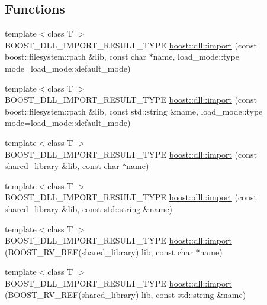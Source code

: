 \subsection*{Functions}
\begin{DoxyCompactItemize}
\item 
{\footnotesize template$<$class T $>$ }\\B\+O\+O\+S\+T\+\_\+\+D\+L\+L\+\_\+\+I\+M\+P\+O\+R\+T\+\_\+\+R\+E\+S\+U\+L\+T\+\_\+\+T\+Y\+PE \hyperlink{a00254_ade82cd3690b6f9f21ce1f92563c04694}{boost\+::dll\+::import} (const boost\+::filesystem\+::path \&lib, const char $\ast$name, load\+\_\+mode\+::type mode=load\+\_\+mode\+::default\+\_\+mode)
\item 
{\footnotesize template$<$class T $>$ }\\B\+O\+O\+S\+T\+\_\+\+D\+L\+L\+\_\+\+I\+M\+P\+O\+R\+T\+\_\+\+R\+E\+S\+U\+L\+T\+\_\+\+T\+Y\+PE \hyperlink{a00254_aabe8a061e53eb6ec4ea80ff5eb7a9c29}{boost\+::dll\+::import} (const boost\+::filesystem\+::path \&lib, const std\+::string \&name, load\+\_\+mode\+::type mode=load\+\_\+mode\+::default\+\_\+mode)
\item 
{\footnotesize template$<$class T $>$ }\\B\+O\+O\+S\+T\+\_\+\+D\+L\+L\+\_\+\+I\+M\+P\+O\+R\+T\+\_\+\+R\+E\+S\+U\+L\+T\+\_\+\+T\+Y\+PE \hyperlink{a00254_a1feb1943049297f6177c9e80d1f96202}{boost\+::dll\+::import} (const shared\+\_\+library \&lib, const char $\ast$name)
\item 
{\footnotesize template$<$class T $>$ }\\B\+O\+O\+S\+T\+\_\+\+D\+L\+L\+\_\+\+I\+M\+P\+O\+R\+T\+\_\+\+R\+E\+S\+U\+L\+T\+\_\+\+T\+Y\+PE \hyperlink{a00254_a7697764076cbe4d8e7705b2a4710c76f}{boost\+::dll\+::import} (const shared\+\_\+library \&lib, const std\+::string \&name)
\item 
{\footnotesize template$<$class T $>$ }\\B\+O\+O\+S\+T\+\_\+\+D\+L\+L\+\_\+\+I\+M\+P\+O\+R\+T\+\_\+\+R\+E\+S\+U\+L\+T\+\_\+\+T\+Y\+PE \hyperlink{a00254_a6008e873f45aa7cc22b8d556670a6b85}{boost\+::dll\+::import} (B\+O\+O\+S\+T\+\_\+\+R\+V\+\_\+\+R\+EF(shared\+\_\+library) lib, const char $\ast$name)
\item 
{\footnotesize template$<$class T $>$ }\\B\+O\+O\+S\+T\+\_\+\+D\+L\+L\+\_\+\+I\+M\+P\+O\+R\+T\+\_\+\+R\+E\+S\+U\+L\+T\+\_\+\+T\+Y\+PE \hyperlink{a00254_a3a30149253feebe550a411593bfb90b5}{boost\+::dll\+::import} (B\+O\+O\+S\+T\+\_\+\+R\+V\+\_\+\+R\+EF(shared\+\_\+library) lib, const std\+::string \&name)

\end{DoxyCompactItemize}
